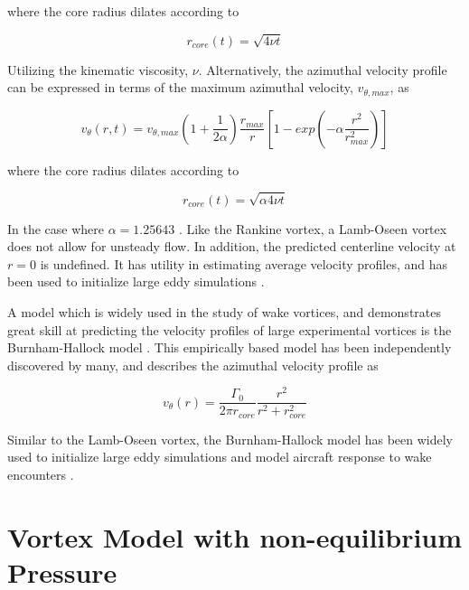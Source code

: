 \noindent
where the core radius dilates according to 

\begin{equation}
r_{core}(t) = \sqrt{4 \nu t}
	\label{eq:lamb2}
\end{equation}

\noindent
Utilizing the kinematic viscosity, $\nu$. Alternatively, the azimuthal velocity 
profile can be expressed in terms of the maximum azimuthal velocity, 
$v_{\theta, max}$, as

\begin{equation}
v_{\theta}(r,t) = v_{\theta, max} (1 + \frac{1}{2 \alpha}) \frac{r_{max}}{r} 
[1 - exp(- \alpha \frac{r^2}{r_{max}^2})]
\label{eq:lamb3}
\end{equation}

\noindent
where the core radius dilates according to 

\begin{equation}
r_{core}(t) = \sqrt{\alpha 4 \nu t}
\label{eq:lamb4}
\end{equation}

\noindent
In the case where $\alpha = 1.25643$ \cite{davenport1996}. Like the Rankine 
vortex, a 
Lamb-Oseen vortex does not allow for unsteady flow. In addition, the predicted 
centerline velocity at $r=0$ is undefined. It has utility in estimating average 
velocity profiles, and has been used to initialize large eddy 
simulations \cite{hennemann2011}.

A model which is widely used in the study of wake vortices, and demonstrates 
great skill at predicting the velocity profiles of large experimental vortices 
is the Burnham-Hallock model \cite{burnham1982}. This empirically based model 
has been independently discovered by many, and describes the 
azimuthal velocity profile as

\begin{equation}
v_{\theta}(r) = \frac{\Gamma_0}{2 \pi r_{core}} \frac{r^2}{r^2 + r_{core}^2}
\label{eq:burnham-hallock}
\end{equation}

\noindent
Similar to the Lamb-Oseen vortex, the Burnham-Hallock model has been widely 
used to initialize large eddy simulations and model aircraft response to wake 
encounters \cite{ahmad2014}.

\section{Vortex Model with non-equilibrium Pressure}

